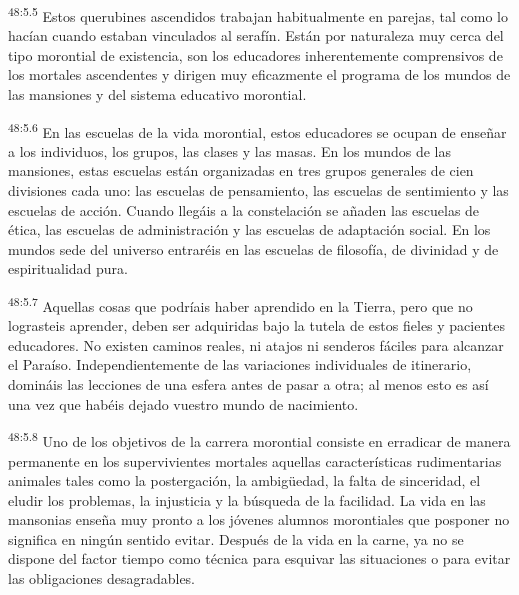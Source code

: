 \par
\textsuperscript{48:5.5} Estos querubines ascendidos trabajan habitualmente en parejas, tal como lo hacían cuando estaban vinculados al serafín. Están por naturaleza muy cerca del tipo morontial de existencia, son los educadores inherentemente comprensivos de los mortales ascendentes y dirigen muy eficazmente el programa de los mundos de las mansiones y del sistema educativo morontial.

\par
\textsuperscript{48:5.6} En las escuelas de la vida morontial, estos educadores se ocupan de enseñar a los individuos, los grupos, las clases y las masas. En los mundos de las mansiones, estas escuelas están organizadas en tres grupos generales de cien divisiones cada uno: las escuelas de pensamiento, las escuelas de sentimiento y las escuelas de acción. Cuando llegáis a la constelación se añaden las escuelas de ética, las escuelas de administración y las escuelas de adaptación social. En los mundos sede del universo entraréis en las escuelas de filosofía, de divinidad y de espiritualidad pura.

\par
\textsuperscript{48:5.7} Aquellas cosas que podríais haber aprendido en la Tierra, pero que no lograsteis aprender, deben ser adquiridas bajo la tutela de estos fieles y pacientes educadores. No existen caminos reales, ni atajos ni senderos fáciles para alcanzar el Paraíso. Independientemente de las variaciones individuales de itinerario, domináis las lecciones de una esfera antes de pasar a otra; al menos esto es así una vez que habéis dejado vuestro mundo de nacimiento.

\par
\textsuperscript{48:5.8} Uno de los objetivos de la carrera morontial consiste en erradicar de manera permanente en los supervivientes mortales aquellas características rudimentarias animales tales como la postergación, la ambig\"uedad, la falta de sinceridad, el eludir los problemas, la injusticia y la búsqueda de la facilidad. La vida en las mansonias enseña muy pronto a los jóvenes alumnos morontiales que posponer no significa en ningún sentido evitar. Después de la vida en la carne, ya no se dispone del factor tiempo como técnica para esquivar las situaciones o para evitar las obligaciones desagradables.

